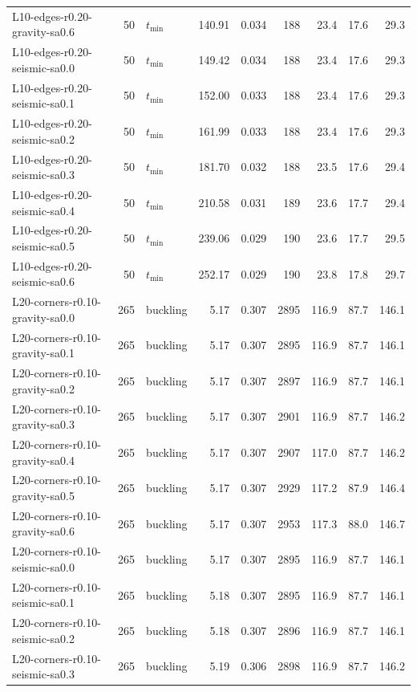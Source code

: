 \begin{tabular}{lrlrrrrrr}
L10-edges-r0.20-gravity-sa0.6 & 50 & $t_{\mathrm{min}}$ & 140.91 & 0.034 & 188 & 23.4 & 17.6 & 29.3 \\
L10-edges-r0.20-seismic-sa0.0 & 50 & $t_{\mathrm{min}}$ & 149.42 & 0.034 & 188 & 23.4 & 17.6 & 29.3 \\
L10-edges-r0.20-seismic-sa0.1 & 50 & $t_{\mathrm{min}}$ & 152.00 & 0.033 & 188 & 23.4 & 17.6 & 29.3 \\
L10-edges-r0.20-seismic-sa0.2 & 50 & $t_{\mathrm{min}}$ & 161.99 & 0.033 & 188 & 23.4 & 17.6 & 29.3 \\
L10-edges-r0.20-seismic-sa0.3 & 50 & $t_{\mathrm{min}}$ & 181.70 & 0.032 & 188 & 23.5 & 17.6 & 29.4 \\
L10-edges-r0.20-seismic-sa0.4 & 50 & $t_{\mathrm{min}}$ & 210.58 & 0.031 & 189 & 23.6 & 17.7 & 29.4 \\
L10-edges-r0.20-seismic-sa0.5 & 50 & $t_{\mathrm{min}}$ & 239.06 & 0.029 & 190 & 23.6 & 17.7 & 29.5 \\
L10-edges-r0.20-seismic-sa0.6 & 50 & $t_{\mathrm{min}}$ & 252.17 & 0.029 & 190 & 23.8 & 17.8 & 29.7 \\
L20-corners-r0.10-gravity-sa0.0 & 265 & buckling & 5.17 & 0.307 & 2895 & 116.9 & 87.7 & 146.1 \\
L20-corners-r0.10-gravity-sa0.1 & 265 & buckling & 5.17 & 0.307 & 2895 & 116.9 & 87.7 & 146.1 \\
L20-corners-r0.10-gravity-sa0.2 & 265 & buckling & 5.17 & 0.307 & 2897 & 116.9 & 87.7 & 146.1 \\
L20-corners-r0.10-gravity-sa0.3 & 265 & buckling & 5.17 & 0.307 & 2901 & 116.9 & 87.7 & 146.2 \\
L20-corners-r0.10-gravity-sa0.4 & 265 & buckling & 5.17 & 0.307 & 2907 & 117.0 & 87.7 & 146.2 \\
L20-corners-r0.10-gravity-sa0.5 & 265 & buckling & 5.17 & 0.307 & 2929 & 117.2 & 87.9 & 146.4 \\
L20-corners-r0.10-gravity-sa0.6 & 265 & buckling & 5.17 & 0.307 & 2953 & 117.3 & 88.0 & 146.7 \\
L20-corners-r0.10-seismic-sa0.0 & 265 & buckling & 5.17 & 0.307 & 2895 & 116.9 & 87.7 & 146.1 \\
L20-corners-r0.10-seismic-sa0.1 & 265 & buckling & 5.18 & 0.307 & 2895 & 116.9 & 87.7 & 146.1 \\
L20-corners-r0.10-seismic-sa0.2 & 265 & buckling & 5.18 & 0.307 & 2896 & 116.9 & 87.7 & 146.1 \\
L20-corners-r0.10-seismic-sa0.3 & 265 & buckling & 5.19 & 0.306 & 2898 & 116.9 & 87.7 & 146.2 \\

\end{tabular}
